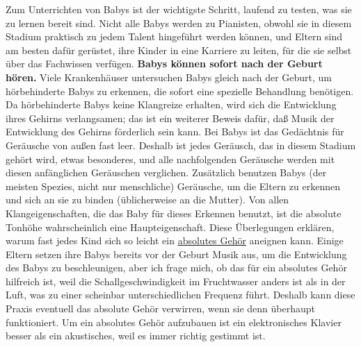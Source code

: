 Zum Unterrichten von Babys ist der wichtigste Schritt, laufend zu testen, was sie zu lernen bereit sind.
Nicht alle Babys werden zu Pianisten, obwohl sie in diesem Stadium praktisch zu jedem Talent hingeführt werden können, und Eltern sind am besten dafür gerüstet, ihre Kinder in eine Karriere zu leiten, für die sie selbst über das Fachwissen verfügen.
\textbf{Babys können sofort nach der Geburt hören.}
Viele Krankenhäuser untersuchen Babys gleich nach der Geburt, um hörbehinderte Babys zu erkennen, die sofort eine spezielle Behandlung benötigen.
Da hörbehinderte Babys keine Klangreize erhalten, wird sich die Entwicklung ihres Gehirns verlangsamen; das ist ein weiterer Beweis dafür, daß Musik der Entwicklung des Gehirns förderlich sein kann.
Bei Babys ist das Gedächtnis für Geräusche von außen fast leer.
Deshalb ist jedes Geräusch, das in diesem Stadium gehört wird, etwas besonderes, und alle nachfolgenden Geräusche werden mit diesen anfänglichen Geräuschen verglichen.
Zusätzlich benutzen Babys (der meisten Spezies, nicht nur menschliche) Geräusche, um die Eltern zu erkennen und sich an sie zu binden (üblicherweise an die Mutter).
Von allen Klangeigenschaften, die das Baby für dieses Erkennen benutzt, ist die absolute Tonhöhe wahrscheinlich eine Haupteigenschaft.
Diese Überlegungen erklären, warum fast jedes Kind sich so leicht ein \hyperlink{c1iii12}{absolutes Gehör} aneignen kann.
Einige Eltern setzen ihre Babys bereits vor der Geburt Musik aus, um die Entwicklung des Babys zu beschleunigen, aber ich frage mich, ob das für ein absolutes Gehör hilfreich ist, weil die Schallgeschwindigkeit im Fruchtwasser anders ist als in der Luft, was zu einer scheinbar unterschiedlichen Frequenz führt.
Deshalb kann diese Praxis eventuell das absolute Gehör verwirren, wenn sie denn überhaupt funktioniert.
Um ein absolutes Gehör aufzubauen ist ein elektronisches Klavier besser als ein akustisches, weil es immer richtig gestimmt ist.

